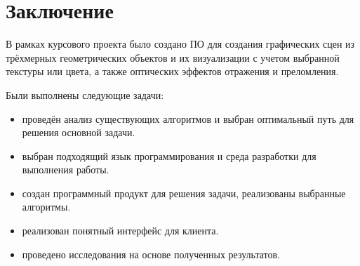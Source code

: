 \chapter*{Заключение}
В рамках курсового проекта было создано ПО для создания графических сцен из трёхмерных геометрических объектов
и их визуализации с учетом выбранной текстуры или цвета, а также оптических эффектов отражения и преломления.

Были выполнены следующие задачи:

\begin{itemize}
	\item проведён анализ существующих алгоритмов и выбран оптимальный путь для решения основной задачи.
	\item выбран подходящий язык программирования и среда разработки для выполнения работы.
	\item создан программный продукт для решения задачи, реализованы выбранные алгоритмы.
	\item реализован понятный интерфейс для клиента.
	\item проведено исследования на основе полученных результатов.
\end{itemize}